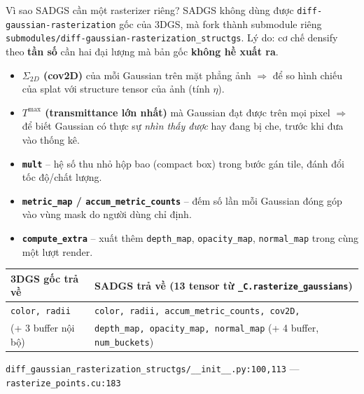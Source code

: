 
\begin{frame}{Vì sao SADGS cần một rasterizer riêng?}
\footnotesize
SADGS không dùng được \texttt{diff-gaussian-rasterization} gốc của 3DGS, mà fork thành submodule riêng
\texttt{submodules/diff-gaussian-rasterization\_structgs}. Lý do: cơ chế densify theo \textbf{tần số} cần hai đại lượng mà bản gốc \textbf{không hề xuất ra}.
\begin{itemize}\itemsep2pt
    \item \textbf{$\Sigma_{2D}$ (cov2D)} của mỗi Gaussian trên mặt phẳng ảnh $\Rightarrow$ để so hình chiếu của splat với structure tensor của ảnh (tính $\eta$).
    \item \textbf{$T^{\max}$ (transmittance lớn nhất)} mà Gaussian đạt được trên mọi pixel $\Rightarrow$ để biết Gaussian có thực sự \textit{nhìn thấy được} hay đang bị che, trước khi đưa vào thống kê.
    \item \textbf{\texttt{mult}} -- hệ số thu nhỏ hộp bao (compact box) trong bước gán tile, đánh đổi tốc độ/chất lượng.
    \item \textbf{\texttt{metric\_map} / \texttt{accum\_metric\_counts}} -- đếm số lần mỗi Gaussian đóng góp vào vùng mask do người dùng chỉ định.
    \item \textbf{\texttt{compute\_extra}} -- xuất thêm \texttt{depth\_map}, \texttt{opacity\_map}, \texttt{normal\_map} trong cùng một lượt render.
\end{itemize}
\vspace{0.15cm}
\centering
\begin{tabular}{ll}
\toprule
\textbf{3DGS gốc trả về} & \textbf{SADGS trả về (13 tensor từ \texttt{\_C.rasterize\_gaussians})}\\
\midrule
\texttt{color, radii} & \texttt{color, radii, accum\_metric\_counts, cov2D,}\\
(+ 3 buffer nội bộ) & \texttt{depth\_map, opacity\_map, normal\_map} (+ 4 buffer, \texttt{num\_buckets})\\
\bottomrule
\end{tabular}
\vspace{0.1cm}
\scriptsize\raggedright
\texttt{diff\_gaussian\_rasterization\_structgs/\_\_init\_\_.py:100,113} --- \texttt{rasterize\_points.cu:183}
\end{frame}

